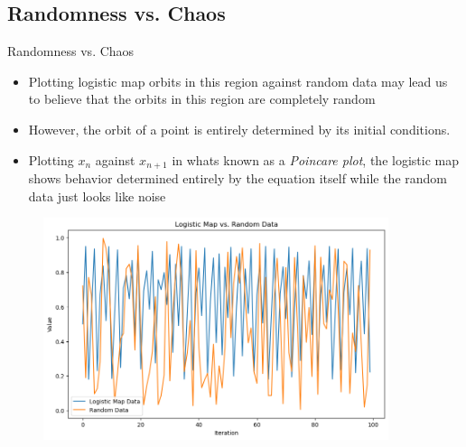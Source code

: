 \documentclass[
	11pt, %
]{beamer}
\begin{document}
\subsection{Randomness vs. Chaos}
\begin{frame}{Randomness vs. Chaos}
\begin{itemize}
    \item Plotting logistic map orbits in this region against random data may lead us to believe that the orbits in this region are completely random
    \item However, the orbit of a point is entirely determined by its initial conditions.
    \item Plotting $x_{n}$ against $x_{n+1}$ in whats known as a \emph{Poincare plot}, the logistic map shows behavior determined entirely by the equation itself while the random data just looks like noise
\end{itemize}

\begin{figure}
    \centering
    \begin{minipage}{0.45\textwidth}
        \centering
        \includegraphics[width=0.9\textwidth]{./figures/logvsrand.png}%


\end{minipage}
\end{figure}
\end{frame}
\end{document}
